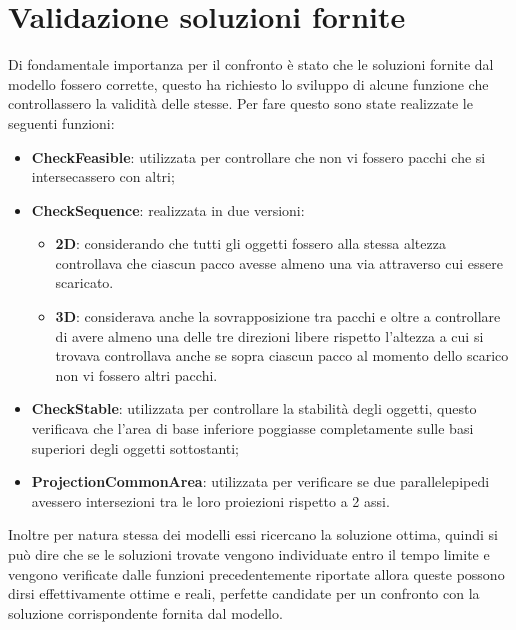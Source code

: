 \section{Validazione soluzioni fornite}
Di fondamentale importanza per il confronto è stato che le soluzioni fornite dal modello fossero corrette, questo ha richiesto lo sviluppo di alcune funzione che controllassero la validità delle stesse. Per fare questo sono state realizzate le seguenti funzioni:
\begin{itemize}
	\item \textbf{CheckFeasible}: utilizzata per controllare che non vi fossero pacchi che si intersecassero con altri;
	\item \textbf{CheckSequence}: realizzata in due versioni:
	      \begin{itemize}
	      	\item \textbf{2D}: considerando che tutti gli oggetti fossero alla stessa altezza controllava che ciascun pacco avesse almeno una via attraverso cui essere scaricato.
	      	\item \textbf{3D}: considerava anche la sovrapposizione tra pacchi e oltre a controllare di avere almeno una delle tre direzioni libere rispetto l'altezza a cui si trovava controllava anche se sopra ciascun pacco al momento dello scarico non vi fossero altri pacchi.
	      \end{itemize}
	\item \textbf{CheckStable}: utilizzata per controllare la stabilità degli oggetti, questo verificava che l'area di base inferiore poggiasse completamente sulle basi superiori degli oggetti sottostanti;
	\item \textbf{ProjectionCommonArea}: utilizzata per verificare se due parallelepipedi avessero intersezioni tra le loro proiezioni rispetto a 2 assi.
\end{itemize}

Inoltre per natura stessa dei modelli essi ricercano la soluzione ottima, quindi si può dire che se le soluzioni trovate vengono individuate entro il tempo limite e vengono verificate dalle funzioni precedentemente riportate allora queste possono dirsi effettivamente ottime e reali, perfette candidate per un confronto con la soluzione corrispondente fornita dal modello.
